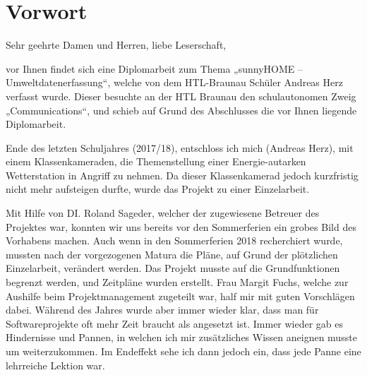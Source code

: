 

\chapter*{Vorwort}


Sehr geehrte Damen und Herren, liebe Leserschaft, \newline


vor Ihnen findet sich eine Diplomarbeit zum Thema „sunnyHOME – Umweltdatenerfassung“, welche von dem HTL-Braunau Schüler Andreas Herz verfasst wurde. Dieser besuchte an der HTL Braunau den schulautonomen Zweig „Communications“, und schieb auf Grund des Abschlusses die vor Ihnen liegende Diplomarbeit.\newline

Ende des letzten Schuljahres (2017/18), entschloss ich mich (Andreas Herz), mit einem Klassenkameraden, die Themenstellung einer Energie-autarken Wetterstation in Angriff zu nehmen. Da dieser Klassenkamerad jedoch kurzfristig nicht mehr aufsteigen durfte, wurde das Projekt zu einer Einzelarbeit.\newline

Mit Hilfe von DI. Roland Sageder, welcher der zugewiesene Betreuer des Projektes war, konnten wir uns bereits vor den Sommerferien ein grobes Bild des Vorhabens machen. Auch wenn in den Sommerferien 2018 recherchiert wurde, mussten nach der vorgezogenen Matura die Pläne, auf Grund der plötzlichen Einzelarbeit, verändert werden. Das Projekt musste auf die Grundfunktionen begrenzt werden, und Zeitpläne wurden erstellt. Frau Margit Fuchs, welche zur Aushilfe beim Projektmanagement zugeteilt war, half mir mit guten Vorschlägen dabei. Während des Jahres wurde aber immer wieder klar, dass man für Softwareprojekte oft mehr Zeit braucht als angesetzt ist. Immer wieder gab es Hindernisse und Pannen, in welchen ich mir zusätzliches Wissen aneignen musste um weiterzukommen. Im Endeffekt sehe ich dann jedoch ein, dass jede Panne eine lehrreiche Lektion war.\newline

